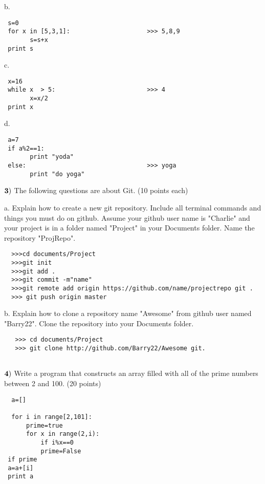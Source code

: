 \documentclass{article}
\begin{document}
 b.  \begin{verbatim}
 s=0                                    
 for x in [5,3,1]:                     >>> 5,8,9
       s=s+x
 print s
 \end{verbatim}
 \vspace{1cm}
 
 c.  \begin{verbatim}
 x=16
 while x  > 5:                         >>> 4 
       x=x/2
 print x
 \end{verbatim}
 \vspace{1cm}
 
 d.   \begin{verbatim}
 a=7
 if a%2==1:
       print "yoda"
 else:                                 >>> yoga
       print "do yoga"
 \end{verbatim}
 \vspace{1cm}
  \newpage

  
  $\bf{3)}$  The following questions are about Git. (10 points each)
  \vspace{0.5cm}
    
  a.  Explain how to create a new git repository.  Include all terminal commands and things you must do on github.  Assume your github user name is "Charlie" and your project is in a folder named "Project" in your Documents folder.  Name the repository "ProjRepo".
  \begin{verbatim}
  >>>cd documents/Project
  >>>git init
  >>>git add .
  >>>git commit -m"name"
  >>>git remote add origin https://github.com/name/projectrepo git .
  >>> git push origin master
  \end{verbatim}
    \vspace{8cm}
  
  b.  Explain how to clone a repository name "Awesome" from github user named "Barry22".  Clone the repository into your Documents folder.
    \vspace{4cm}
   \begin{verbatim}
   >>> cd documents/Project
   >>> git clone http://github.com/Barry22/Awesome git.
   
    \end{verbatim}
 
  
  $\bf{4)}$ Write a program that constructs an array filled with all of the prime numbers between 2 and 100. (20 points)
  \vspace{0.5cm}
   \begin{verbatim}
  a=[]
 
  for i in range[2,101]:
      prime=true
      for x in range(2,i):
          if i%x==0
          prime=False
 if prime
 a=a+[i]
 print a 
 \end{verbatim}
  
  

 
\end{document}
